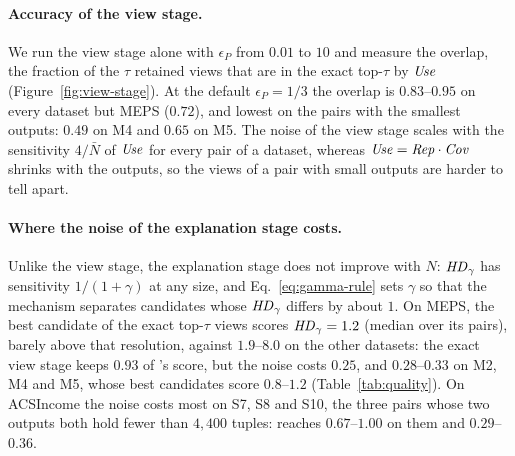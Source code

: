 \paragraph{Accuracy of the view stage.}
We run the view stage alone with $\epsilon_P$ from $0.01$ to $10$ and measure the overlap, the fraction of the $\tau$ retained views that are in the exact top-$\tau$ by $\mathit{Use}$ (Figure~\ref{fig:view-stage}).
At the default $\epsilon_P=1/3$ the overlap is $0.83$--$0.95$ on every dataset but MEPS ($0.72$), and lowest on the pairs with the smallest outputs: $0.49$ on M4 and $0.65$ on M5.
The noise of the view stage scales with the sensitivity $4/\bar N$ of $\mathit{Use}$ for every pair of a dataset, whereas $\mathit{Use}=\mathit{Rep}\cdot\mathit{Cov}$ shrinks with the outputs, so the views of a pair with small outputs are harder to tell apart.

\paragraph{Where the noise of the explanation stage costs.}
Unlike the view stage, the explanation stage does not improve with $N$: $\mathit{HD}_\gamma$ has sensitivity $1/(1+\gamma)$ at any size, and Eq.~\eqref{eq:gamma-rule} sets $\gamma$ so that the mechanism separates candidates whose $\mathit{HD}_\gamma$ differs by about $1$.
On MEPS, the best candidate of the exact top-$\tau$ views scores $\mathit{HD}_\gamma=1.2$ (median over its pairs), barely above that resolution, against $1.9$--$8.0$ on the other datasets: the exact view stage keeps $0.93$ of \BF{}'s score, but the noise costs $0.25$, and $0.28$--$0.33$ on M2, M4 and M5, whose best candidates score $0.8$--$1.2$ (Table~\ref{tab:quality}).
On ACSIncome the noise costs most on S7, S8 and S10, the three pairs whose two outputs both hold fewer than $4{,}400$ tuples: \Bone{} reaches $0.67$--$1.00$ on them and \sys{} $0.29$--$0.36$.

